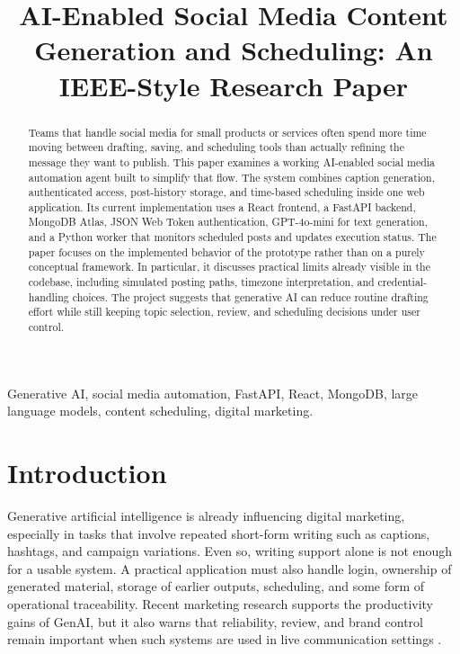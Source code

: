 \documentclass[conference]{IEEEtran}
\title{AI-Enabled Social Media Content Generation and Scheduling: An IEEE-Style Research Paper}
\author{
\IEEEauthorblockN{Abhi}
\IEEEauthorblockA{
Department of Computer Science and Engineering\\
Project: AI Social Media Automation Agent
}
}
\begin{document}
\maketitle

\begin{abstract}
Teams that handle social media for small products or services often spend more time moving between drafting, saving, and scheduling tools than actually refining the message they want to publish. This paper examines a working AI-enabled social media automation agent built to simplify that flow. The system combines caption generation, authenticated access, post-history storage, and time-based scheduling inside one web application. Its current implementation uses a React frontend, a FastAPI backend, MongoDB Atlas, JSON Web Token authentication, GPT-4o-mini for text generation, and a Python worker that monitors scheduled posts and updates execution status. The paper focuses on the implemented behavior of the prototype rather than on a purely conceptual framework. In particular, it discusses practical limits already visible in the codebase, including simulated posting paths, timezone interpretation, and credential-handling choices. The project suggests that generative AI can reduce routine drafting effort while still keeping topic selection, review, and scheduling decisions under user control.
\end{abstract}

\begin{IEEEkeywords}
Generative AI, social media automation, FastAPI, React, MongoDB, large language models, content scheduling, digital marketing.
\end{IEEEkeywords}

\section{Introduction}

Generative artificial intelligence is already influencing digital marketing, especially in tasks that involve repeated short-form writing such as captions, hashtags, and campaign variations. Even so, writing support alone is not enough for a usable system. A practical application must also handle login, ownership of generated material, storage of earlier outputs, scheduling, and some form of operational traceability. Recent marketing research supports the productivity gains of GenAI, but it also warns that reliability, review, and brand control remain important when such systems are used in live communication settings \cite{grewal2025,cillo2025}.
\end{document}
